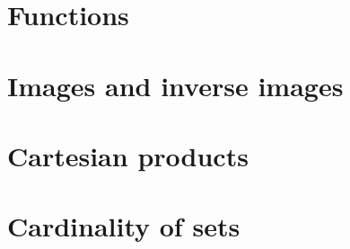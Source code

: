 \documentclass[../main.tex]{subfiles}
\begin{document}
\addtocounter{section}{2}
\section{Functions}\label{3.3}

\section{Images and inverse images}\label{3.4}

\section{Cartesian products}
\section{Cardinality of sets}
\end{document}
